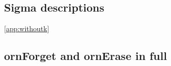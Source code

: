 \begin{appendix}
\subsection{Sigma descriptions}\label{app:large-sigma}
\autoref{app:withoutk}

\subsection{ornForget and ornErase in full}\label{app:ornforget}

\begin{comment}
    \subsection{Heterogenization}
    
\footnote{If a foldable universe means nothing to you, there are simpler encodings for parameters and indices, which are recorded in \autoref{app:large-sigma}.}
    

\ExecuteMetaData[Ornament/OrnDesc]{toOrn} -> Appendix if at all

    \subsection{More equivalences for less effort}\label{sec:userfriendly}
    Noting that constructing equivalences directly or from isomorphisms as in \autoref{ssec:leibniz} can quickly become challenging when one of the sides is complicated, we work out a different approach making use of the initial semantics of W-types instead. We claim that the functions in the isomorphism of \autoref{ssec:leibniz} were partially forced, but this fact was unused there.
    
    First, we explain that if we assume that one of the two sides of the equivalence is a fixpoint or initial algebra of a polynomial functor (that is, the \AgdaDatatype{μ} of a \AgdaDatatype{Desc′}), this simplifies giving an equivalence to showing that the other side is also initial.
    
    We describe how we altered the original ornaments \cite{progorn} to ensure that \AgdaDatatype{μ} remains initial for its base functor in Cubical Agda, explaining why this fails otherwise, and how defining base functors as datatypes avoids this issue.
    
    In a subsection focussing on the categorical point of view, we show how we can describe initial algebras (and truncate the appropriate parts) in such a way that the construction both applies to general types (rather than only sets), and still produces an equivalence at the end. We explain how this definition, like the usual definition, makes sure that a pair of initial objects always induces a pair of conversion functions, which automatically become inverses. Finally, we explain that we can escape our earlier truncation by appealing to the fact that ``being an equivalence'' is a proposition.
    

\end{comment}
\end{appendix}
